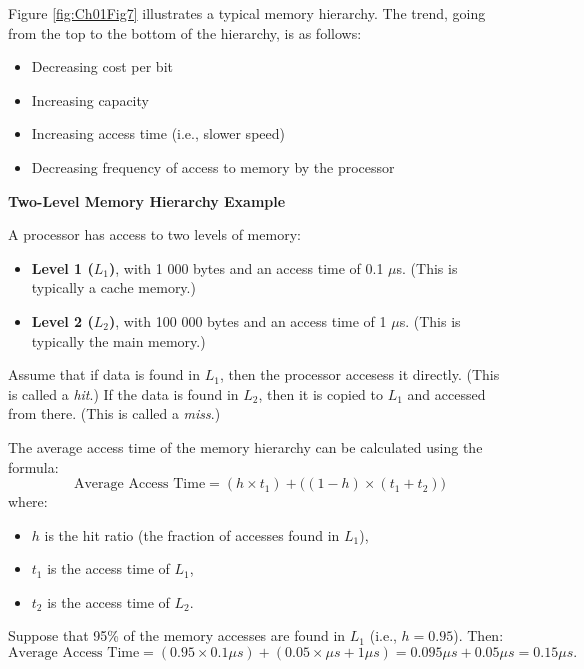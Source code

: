 \documentclass{article}
\begin{document}
Figure \ref{fig:Ch01Fig7} illustrates a typical memory hierarchy.
The trend, going from the top to the bottom of the hierarchy, is as follows:
\begin{itemize}
    \item Decreasing cost per bit
    \item Increasing capacity
    \item Increasing access time (i.e., slower speed)
    \item Decreasing frequency of access to memory by the processor
\end{itemize}

\begin{examplebox}
    \textbf{Two-Level Memory Hierarchy Example}

    A processor has access to two levels of memory:
    \begin{itemize}
        \item \textbf{Level 1 ($L_1$)}, with 1 000 bytes and an access time of 0.1 $\mu$s. (This is typically a cache memory.)
        \item \textbf{Level 2 ($L_2$)}, with 100 000 bytes and an access time of 1 $\mu$s. (This is typically the main memory.) 
    \end{itemize}

    Assume that if data is found in $L_1$, then the processor accesess it directly. (This is called a \textit{hit}.)
    If the data is found in $L_2$, then it is copied to $L_1$ and accessed from there. (This is called a \textit{miss}.)

    The average access time of the memory hierarchy can be calculated using the formula:
    \[
    \text{Average Access Time} = (h \times t_1) + \big((1 - h) \times (t_1 + t_2)\big)
    \]
    where:
    \begin{itemize}
        \item $h$ is the hit ratio (the fraction of accesses found in $L_1$),
        \item $t_1$ is the access time of $L_1$,
        \item $t_2$ is the access time of $L_2$.
    \end{itemize}


    Suppose that 95\% of the memory accesses are found in $L_1$ (i.e., $h = 0.95$). Then:
    \[
    \text{Average Access Time} = (0.95 \times 0.1 \mu s) + (0.05 \times \mu s + 1\mu s) = 0.095 \mu s + 0.05 \mu s = 0.15 \mu s.
    \]
\end{examplebox}
\end{document}
